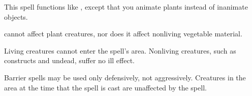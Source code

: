 \begin{comment}
\spellsection{Animate Objects}{5}
\spelldesc{You imbue inanimate objects with mobility and a semblance of life.}
\spellinfo{Trans (Animation)}{Chaos, Trans}
\spelltwocol{\spelllimit{\areamed radius}}{\spellrng{\rngmed}}
\spelltgts{One Small object/level in the area; see text}
\spelldur{\durshort}
\begin{spelleffect}
    Each animated object immediately attacks whomever or whatever you initially designate. Your control of the objects is limited to simple commands (``Attack,'' ``Defend,'' ``Stop,'' and so forth).
    \par An animated object can be of any nonmagical material. You may animate one Small or smaller object or an equivalent number of larger objects per caster level. A Medium object counts as two Small or smaller objects, a Large object as four, a Huge object as eight, a Gargantuan object as sixteen, and a Colossal object as thirty-two. You can give the objects new commands as a move action, as normal for directing an active spell.
\end{spelleffect}
\begin{spellnotes}
    This spell cannot animate objects carried or worn by a creature. This spell can be made permanent with a \spell{permanency} ritual.
\end{spellnotes}
\end{comment}

\begin{spelleffect}
    This spell functions like , except that you animate plants instead of inanimate objects.
\end{spelleffect}
\begin{spellnotes}
     cannot affect plant creatures, nor does it affect nonliving vegetable material.
\end{spellnotes}

\spelldur{\durlong \dismissable}
\begin{spelleffect}
    Living creatures cannot enter the spell's area. Nonliving creatures, such as constructs and undead, suffer no ill effect.
\end{spelleffect}
\begin{spellnotes}
    Barrier spells may be used only defensively, not aggressively. Creatures in the area at the time that the spell is cast are unaffected by the spell.
\end{spellnotes}

